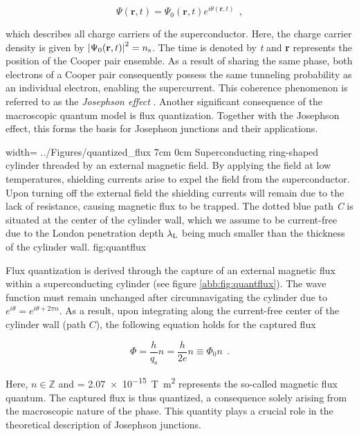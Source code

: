 \begin{equation}
\Psi(\textbf{r},t) = \Psi_0(\textbf{r},t)e^{i\theta(\textbf{r},t)} \ \ ,
\end{equation}

which describes all charge carriers of the superconductor. Here, the charge carrier density is given by $\left|\Psi_0(\textbf{r},t)\right|^2 = n_{\rm s}$. The time is denoted by \textit{t} and \textbf{r} represents the position of the Cooper pair ensemble. As a result of sharing the same phase, both electrons of a Cooper pair consequently possess the same tunneling probability as an individual electron, enabling the supercurrent. This coherence phenomenon is referred to as the \textit{Josephson effect} \cite{Josephson1962}. Another significant consequence of the macroscopic quantum model is flux quantization. Together with the Josephson effect, this forms the basis for Josephson junctions and their applications.

{width=\textwidth}
{../Figures/quantized_flux}
{7cm}
{0cm}
{Superconducting ring-shaped cylinder threaded by an external magnetic field. By applying the field at low temperatures, shielding currents arise to expel the field from the superconductor. Upon turning off the external field the shielding currents will remain due to the lack of resistance, causing magnetic flux to be trapped. The dotted blue path \textit{C} is situated at the center of the cylinder wall, which we assume to be current-free due to the London penetration depth $\lambda_{\rm L}$ being much smaller than the thickness of the cylinder wall.} 
{fig:quantflux}

Flux quantization is derived through the capture of an external magnetic flux within a superconducting cylinder (see figure \ref{abb:fig:quantflux}). The wave function must remain unchanged after circumnavigating the cylinder due to $e^{i\theta} = e^{i\theta + 2\pi n}$. As a result, upon integrating along the current-free center of the cylinder wall (path $C$), the following equation holds for the captured flux

\begin{equation}\label{fq}
\Phi = \frac{h}{q_\mathrm{s}}n = \frac{h}{2e}n \equiv \Phi_0n \ \ .
\end{equation}

Here, $n\in\mathbb{Z}$ and \unit{\fq} = \qty{2.07e-15}{\tesla\metre\squared} \cite{CODATA2018} represents the so-called magnetic flux quantum. The captured flux is thus quantized, a consequence solely arising from the macroscopic nature of the phase. This quantity plays a crucial role in the theoretical description of Josephson junctions.


